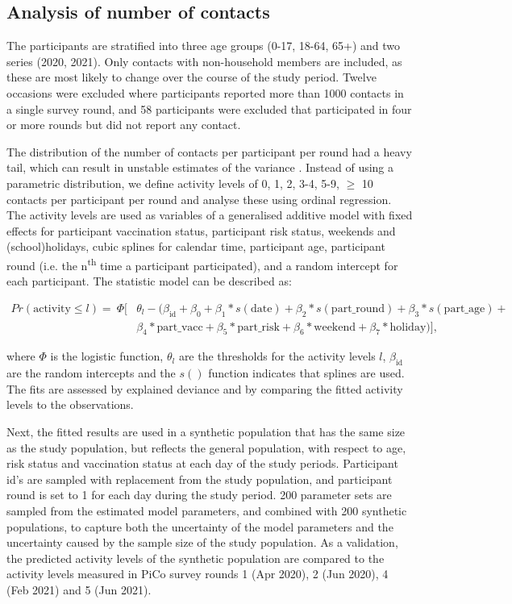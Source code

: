\documentclass[fleqn,10pt]{wlscirep}
\begin{document}
\subsection*{Analysis of number of contacts}

The participants are stratified into three age groups (0-17, 18-64, 65+) and two series (2020, 2021). Only contacts with non-household members are included, as these are most likely to change over the course of the study period. Twelve occasions were excluded where participants reported more than 1000 contacts in a single survey round, and 58 participants were excluded that participated in four or more rounds but did not report any contact.

The distribution of the number of contacts per participant per round had a heavy tail, which can result in unstable estimates of the variance \cite{Tagore_2015}. Instead of using a parametric distribution, we define activity levels of 0, 1, 2, 3-4, 5-9, $\geq$ 10 contacts per participant per round and analyse these using ordinal regression. The activity levels are used as variables of a generalised additive model with fixed effects for participant vaccination status, participant risk status, weekends and (school)holidays, cubic splines for calendar time, participant age, participant round (i.e. the n\textsuperscript{th} time a participant participated), and a random intercept for each participant. The statistic model can be described as:

\begin{align*}
Pr(\mathrm{activity} \leq l) = \: \Phi[ & \theta_l - (\beta_\mathrm{id} + \beta_0 + \beta_1 * s(\mathrm{date}) + \beta_2 * s(\mathrm{part\_round}) + \beta_3 * s(\mathrm{part\_age}) + \\
& \beta_4 * \mathrm{part\_vacc} + \beta_5 * \mathrm{part\_risk} + \beta_6 * \mathrm{weekend} + \beta_7 * \mathrm{holiday})],
\end{align*}

where $\Phi$ is the logistic function, $\theta_l$ are the thresholds for the activity levels $l$, $\beta_\mathrm{id}$ are the random intercepts and the $s()$ function indicates that splines are used. The fits are assessed by explained deviance and by comparing the fitted activity levels to the observations. 

Next, the fitted results are used in a synthetic population that has the same size as the study population, but reflects the general population, with respect to age\cite{CBS_2021}, risk status\cite{Nivel_2021} and vaccination status\cite{RIVM_2022} at each day of the study periods. Participant id's are sampled with replacement from the study population, and participant round is set to 1 for each day during the study period. 200 parameter sets are sampled from the estimated model parameters, and combined with 200 synthetic populations, to capture both the uncertainty of the model parameters and the uncertainty caused by the sample size of the study population. As a validation, the predicted activity levels of the synthetic population are compared to the activity levels measured in PiCo survey rounds 1 (Apr 2020), 2 (Jun 2020), 4 (Feb 2021) and 5 (Jun 2021).
\end{document}
